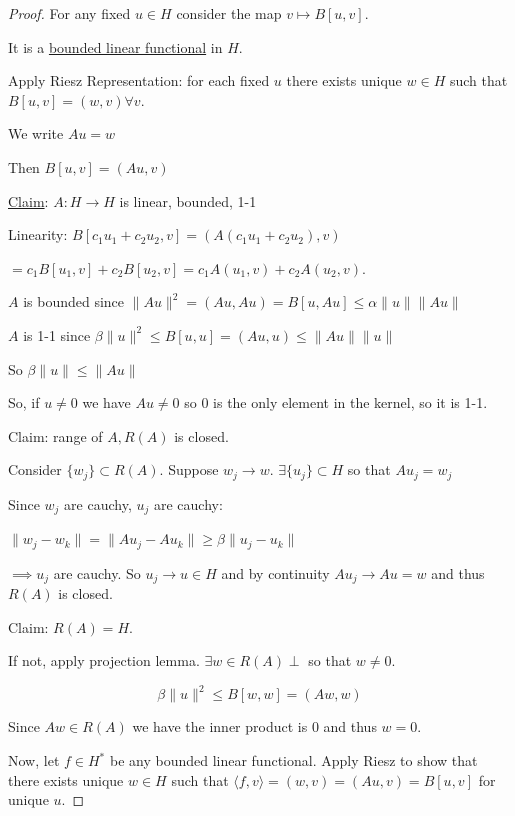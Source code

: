 \documentclass{article}
\theoremstyle{definition}
\begin{document}
\begin{proof}
    For any fixed \(u\in H\) consider the map \(v \mapsto B[u,v]\).
    
    It is a \underline{bounded linear functional} in \(H\).
    
    Apply Riesz Representation: for each fixed \(u\) there exists unique \(w \in H\) such that \(B[u,v] = (w,v) \forall v\).

    We write \(A u = w\) 

    Then \(B[u,v] = (Au, v)\) 

    \underline{Claim}: \(A: H \to H\) is linear, bounded, 1-1
    
    Linearity: \(B[c_1 u_1 + c_2 u_2, v] = (A(c_1 u_1 + c_2 u_2),v)\)
    
    \(= c_1 B[u_1, v] + c_2 B[u_2, v]= c_1 A(u_1, v) + c_2 A(u_2, v)\).
    
    \(A\) is bounded since \(\lVert A u \rVert ^2 = (Au, Au) = B[u, Au] \leq \alpha \lVert u \rVert \lVert Au \rVert \)
    
    \(A\) is 1-1 since \(\beta \lVert u \rVert ^2 \leq B[u,u] = (Au, u) \leq \lVert A u \rVert \lVert u \rVert\) 
    
    So \(\beta \lVert u \rVert \leq \lVert A u \rVert\)

    So, if \(u \neq 0\) we have \(Au \neq 0\) so \(0\) is the only element in the kernel, so it is 1-1.

    Claim: range of \(A, R(A)\) is closed.

    Consider \(\{ w_j \} \subset R(A)\). Suppose \(w_j \to w\). \(\exists \{ u_j \} \subset H\) so that \(A u_j = w_j\) 

    Since \(w_j\) are cauchy, \(u_j\) are cauchy:
    
    \(\lVert w_j - w_k \rVert = \lVert A u_j - A u_k \rVert \geq \beta \lVert u_j - u_k \rVert \) 

    \(\implies u_j\) are cauchy. So \(u_j \to u \in H\) and by continuity \(Au_j \to Au = w\) and thus \(R(A)\) is closed.

    Claim: \(R(A) = H\).

    If not, apply projection lemma. \(\exists w\in R(A)\perp\) so that \(w \neq 0\). 

    \[
        \beta \lVert u \rVert^2 \leq B[w,w] = (Aw, w) 
    \]

    Since \(Aw \in R(A)\) we have the inner product is \(0\) and thus \(w=0\).

    Now, let \(f\in H^{\ast}\) be any bounded linear functional. Apply Riesz to show that there exists unique \(w\in H\) such that \(\langle f,v \rangle = (w,v) = (Au,v) = B[u, v]\) for unique \(u\).   

\end{proof}
\end{document}
